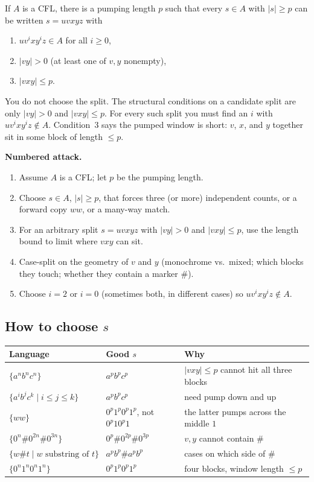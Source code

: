 \documentclass[11pt,a4paper]{article}
\begin{document}
If $A$ is a CFL, there is a pumping length $p$ such that every
$s\in A$ with $|s|\ge p$ can be written $s=uvxyz$ with
\begin{enumerate}[nosep]
  \item $uv^ixy^iz\in A$ for all $i\ge 0$,
  \item $|vy|>0$ (at least one of $v,y$ nonempty),
  \item $|vxy|\le p$.
\end{enumerate}
You do not choose the split. The structural conditions on a
candidate split are only $|vy|>0$ and $|vxy|\le p$. For every
such split you must find an $i$ with $uv^ixy^iz\notin A$.
Condition~3 says the pumped window is short: $v$, $x$, and $y$
together sit in some block of length $\le p$.

\textbf{Numbered attack.}
\begin{enumerate}
  \item Assume $A$ is a CFL; let $p$ be the pumping length.
  \item Choose $s\in A$, $|s|\ge p$, that forces three (or more)
        independent counts, or a forward copy $ww$, or a
        many-way match.
  \item For an arbitrary split $s=uvxyz$ with $|vy|>0$ and
        $|vxy|\le p$, use the length bound to limit where $vxy$
        can sit.
  \item Case-split on the geometry of $v$ and $y$ (monochrome vs.\
        mixed; which blocks they touch; whether they contain a
        marker $\#$).
  \item Choose $i=2$ or $i=0$ (sometimes both, in different
        cases) so $uv^ixy^iz\notin A$.
\end{enumerate}

\subsection{How to choose $s$}

\begin{center}
\begin{tabular}{@{}llp{6.4cm}@{}}
\toprule
Language & Good $s$ & Why \\
\midrule
$\{a^nb^nc^n\}$ & $a^pb^pc^p$ & $|vxy|\le p$ cannot hit all
three blocks \\
$\{a^ib^jc^k\mid i\le j\le k\}$ & $a^pb^pc^p$ & need pump down
and up \\
$\{ww\}$ & $0^p1^p0^p1^p$, not $0^p10^p1$ & the latter pumps
across the middle $1$ \\
$\{0^n\#0^{2n}\#0^{3n}\}$ & $0^p\#0^{2p}\#0^{3p}$ & $v,y$ cannot
contain $\#$ \\
$\{w\#t\mid w\text{ substring of }t\}$ & $a^pb^p\#a^pb^p$ &
cases on which side of $\#$ \\
$\{0^n1^n0^n1^n\}$ & $0^p1^p0^p1^p$ & four blocks, window
length $\le p$ \\
\bottomrule
\end{tabular}
\end{center}
\end{document}
